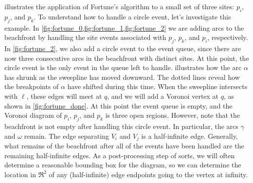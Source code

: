 \documentclass[12pt,twoside]{reedthesis}
\begin{document}
       illustrates the application of Fortune's algorithm to a small set of three sites: $p_{i}$, $p_{j}$, and $p_{k}$. To understand how to handle a circle event, let's investigate this example. In \cref{fig:fortune_0,fig:fortune_1,fig:fortune_2} we are adding arcs to the beachfront by handling the site events associated with $p_{j}$, $p_{k}$, and $p_{i}$, respectively. In \cref{fig:fortune_2}, we also add a circle event to the event queue, since there are now three consecutive arcs in the beachfront with distinct sites. At this point, the circle event is the only event in the queue left to handle.  illustrates how the arc $\alpha$ has shrunk as the sweepline has moved downward.  The dotted lines reveal how the breakpoints of $\alpha$ have shifted during this time. When the sweepline intersects with $\ell$, these edges will meet at $q$, and we will add a Voronoi vertex at $q$, as shown in \cref{fig:fortune_done}. At this point the event queue is empty, and the Voronoi diagram of $p_{i}$, $p_{j}$, and $p_{k}$ is three open regions.  However, note that the beachfront is not empty after handling this circle event. In particular, the arcs $\gamma$ and $\omega$ remain. The edge separating $V_{i}$ and $V_{j}$ is a half-infinite edge. Generally, what remains of the beachfront after all of the events have been handled are the remaining half-infinite edges. As a post-processing step of sorts, we will often determine a reasonable bounding box for the diagram, so we can determine the location in $\Re^2$ of any (half-infinite) edge endpoints going to the vertex at infinity.
   
\end{document}
